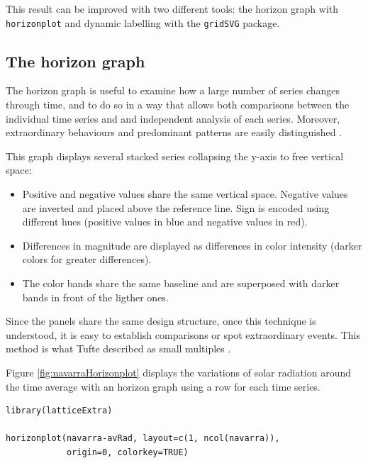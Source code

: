 This result can be improved with two different tools: the horizon
graph with \texttt{horizonplot} and dynamic labelling with the \texttt{gridSVG}
package.
\subsection{The horizon graph}
\label{sec-1-1}


The horizon graph is useful to examine how a
large number of series changes through time, and to do so in a way
that allows both comparisons between the individual time series and
and independent analysis of each series. Moreover,
extraordinary behaviours and predominant patterns are easily
distinguished \cite{Few2008}.

This graph displays several stacked series collapsing the y-axis
to free vertical space:
\begin{itemize}
\item Positive and negative values share the same vertical
  space. Negative values are inverted and placed above the
  reference line. Sign is encoded using different hues (positive
  values in blue and negative values in red).
\item Differences in magnitude are displayed as differences in color
  intensity (darker colors for greater differences).
\item The color bands share the same baseline and are superposed with
  darker bands in front of the ligther ones.
\end{itemize}

Since the panels share the same design structure, once this
technique is understood, it is easy to establish comparisons or
spot extraordinary events.  This method is what Tufte described as
small multiples \cite{Tufte1990}.

Figure \ref{fig:navarraHorizonplot} displays the variations of
solar radiation around the time average with an horizon graph
using a row for each time series.

\lstset{language=R}
\begin{lstlisting}
library(latticeExtra)

horizonplot(navarra-avRad, layout=c(1, ncol(navarra)),
            origin=0, colorkey=TRUE)
\end{lstlisting}

